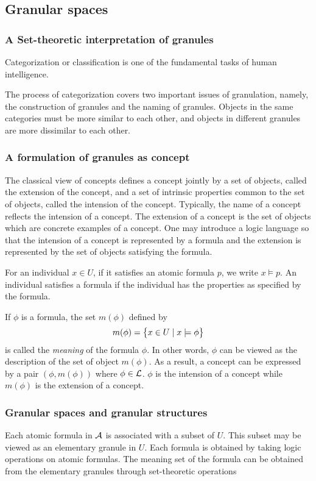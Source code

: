 \documentclass[11pt]{article}
\begin{document}
\subsection{Granular spaces}
\label{sec:org1b28772}
\subsubsection{A Set-theoretic interpretation of granules}
\label{sec:org247f4cb}
Categorization or classification is one of the fundamental tasks of human
intelligence.

The process of categorization covers two important issues of granulation,
namely, the construction of granules and the naming of granules. Objects in the
same categories must be more similar to each other, and objects in different
granules are more dissimilar to each other.
\subsubsection{A formulation of granules as concept}
\label{sec:org0d28417}
The classical view of concepts defines a concept jointly by a set of
objects, called the extension of the concept, and a set of intrinsic
properties common to the set of objects, called the intension of the
concept. Typically, the name of a concept reflects the intension of a
concept. The extension of a concept is the set of objects which are concrete
examples of a concept. One may introduce a logic language so that the
intension of a concept is represented by a formula and the extension is
represented by the set of objects satisfying the formula.

For an individual \(x\in U\), if it satisfies an atomic formula \(p\), we write
\(x\models p\). An individual satisfies a formula if the individual has the
properties as specified by the formula.

If \(\phi\) is a formula, the set \(m(\phi)\) defined by
\begin{equation*}
m(\phi)=\left\{ x\in U\mid x\models \phi\right\}
\end{equation*}
is called the \emph{meaning} of the formula \(\phi\). In other words, \(\phi\) can be
viewed as the description of the set of object \(m(\phi)\). As a result, a
concept can be expressed by a pair \((\phi,m(\phi))\) where \(\phi\in\mathcal{L}\).
\(\phi\) is the intension of a concept while \(m(\phi)\) is the extension of a concept.
\subsubsection{Granular spaces and granular structures}
\label{sec:orge3b1d55}
Each atomic formula in \(\mathcal{A}\) is associated with a subset of \(U\). This
subset may be viewed as an elementary granule in \(U\). Each formula is
obtained by taking logic operations on atomic formulas. The meaning set of
the formula can be obtained from the elementary granules through
set-theoretic operations
\end{document}
